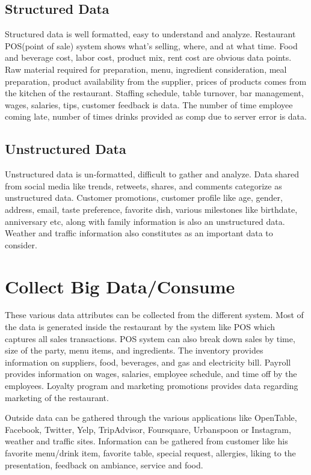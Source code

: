 \documentclass[sigconf]{acmart}
\begin{document}
\subsection{Structured Data}
Structured data is well formatted, easy to understand and analyze. Restaurant POS(point of sale) system shows what’s selling, where, and at what time\cite{www-qsr}. Food and beverage cost, labor cost, product mix, rent cost are obvious data points. Raw material required for preparation, menu, ingredient consideration, meal preparation, product availability from the supplier, prices of products comes from the kitchen of the restaurant. Staffing schedule, table turnover, bar management, wages, salaries, tips, customer feedback is data. The number of time employee coming late, number of times drinks provided as comp due to server error is data.\cite{www-restaurant}
\subsection{Unstructured Data}
Unstructured data is un-formatted, difficult to gather and analyze. Data shared from social media like trends, retweets, shares, and comments categorize as unstructured data. Customer promotions, customer profile like age, gender, address, email, taste preference, favorite dish, various milestones like birthdate, anniversary etc, along with family information is also an unstructured data. Weather and traffic information also constitutes as an important data to consider. \cite{www-restaurant}


\section{Collect Big Data/Consume}
These various data attributes can be collected from the different system. Most of the data is generated inside the restaurant by the system like POS which captures all sales transactions. POS system can also break down sales by time, size of the party, menu items, and ingredients. The inventory provides information on suppliers, food, beverages, and gas and electricity bill. Payroll provides information on wages, salaries, employee schedule, and time off by the employees. Loyalty program and marketing promotions provides data regarding marketing of the restaurant.


Outside data can be gathered through the various applications like OpenTable, Facebook, Twitter, Yelp, TripAdvisor, Foursquare, Urbanspoon or Instagram, weather and traffic sites. Information can be gathered from customer like his favorite menu/drink item, favorite table, special request, allergies, liking to the presentation, feedback on ambiance, service and food. \cite{www-restaurant}
\end{document}
